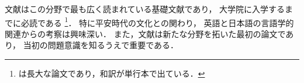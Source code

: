 \documentclass[12pt]{jlreq}
\begin{document}
文献\autocite{hoge2000,foobar1990}はこの分野で最も広く読まれている基礎文献であり，
大学院に入学するまでに必読である
\footnote{\cite{foobar1990}は長大な論文であり，和訳が単行本で出ている\cite{foobar1995}．}．
特に平安時代の文化との関わり\autocite[25]{hoge2000}，
英語と日本語の言語学的関連からの考察\autocite[30--35]{hoge2000}は興味深い．
また，文献\autocite{hoge2001}は新たな分野を拓いた最初の論文であり，
当初の問題意識を知るうえで重要である．
\printbibliography
\end{document}
